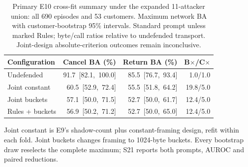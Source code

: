 \begin{table}[t]\centering\footnotesize\setlength{\tabcolsep}{2pt}
\caption{Primary E10 cross-fit summary under the expanded 11-attacker union: all 690 episodes and 53 customers. Maximum network BA with customer-bootstrap 95\% intervals. Standard prompt unless marked Rules; byte/call ratios relative to undefended transport. Joint-design absolute-criterion outcomes remain inconclusive.}\label{tab:r5}
\begin{tabular}{@{}lrrr@{}}\toprule
Configuration & Cancel BA (\%) & Return BA (\%) & B$\times$/C$\times$\\\midrule
Undefended & \mbox{91.7 [82.1, 100.0]} & \mbox{85.5 [76.7, 93.4]} & 1.0/1.0\\
Joint constant & \mbox{60.5 [52.9, 72.4]} & \mbox{55.5 [51.8, 64.2]} & 19.8/5.0\\
Joint buckets & \mbox{57.1 [50.0, 71.5]} & \mbox{52.7 [50.0, 61.7]} & 12.4/5.0\\
Rules + buckets & \mbox{56.9 [50.2, 71.2]} & \mbox{52.7 [50.0, 65.0]} & 12.4/5.0\\
\bottomrule\end{tabular}
\par\smallskip\raggedright Joint constant is E9's shadow-count plus constant-framing design, refit within each fold. Joint buckets changes framing to 1024-byte buckets. Every bootstrap draw reselects the complete maximum; S21 reports both prompts, AUROC and paired reductions.
\end{table}
